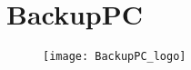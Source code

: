 
\section{BackupPC}%
\label{sec:backuppc}

\begin{figure}[H]
    \centering
    \texttt{[image: BackupPC\_logo]}
\end{figure}
